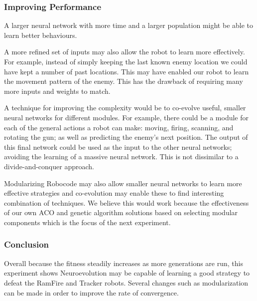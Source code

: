\subsubsection{Improving Performance}
A larger neural network with more time and a larger population might be able to learn better behaviours.

A more refined set of inputs may also allow the robot to learn more effectively. For example, instead of simply keeping the last known enemy location we could have kept a number of past locations. This may have enabled our robot to learn the movement pattern of the enemy. This has the drawback of requiring many more inputs and weights to match.

A technique for improving the complexity would be to co-evolve useful, smaller neural networks for different modules. For example, there could be a module for each of the general actions a robot can make: moving, firing, scanning, and rotating the gun; as well as predicting the enemy's next position.  The output of this final network could be used as the input to the other neural networks; avoiding the learning of a massive neural network. This is not dissimilar to a divide-and-conquer approach.

Modularizing Robocode may also allow smaller neural networks to learn more effective strategies and co-evolution may enable these to find interesting combination of techniques. We believe this would work because the effectiveness of our own ACO and genetic algorithm solutions based on selecting modular components which is the focus of the next experiment.


\subsubsection{Conclusion}
Overall because the fitness steadily increases as more generations are run, this experiment shows Neuroevolution may be capable of learning a good strategy to defeat the RamFire and Tracker robots. Several changes such as modularization can be made in order to improve the rate of convergence.
